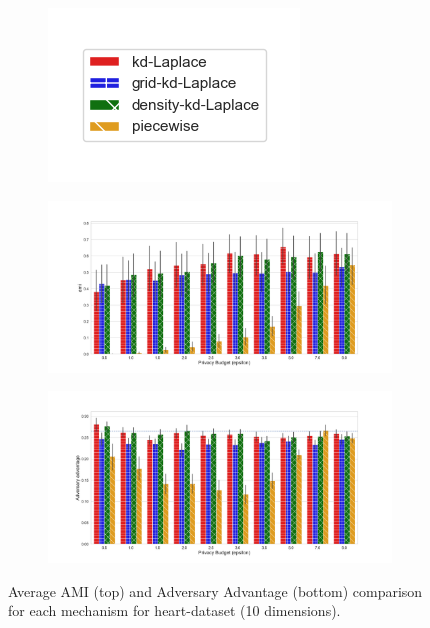 \begin{figure}[H]
  \centering
  \begin{subfigure}{0.30\textwidth}
    \includegraphics[width=\textwidth]{Results/kd-laplace/ami_bar_comparison_legend.png}
  \end{subfigure}
  \begin{subfigure}{1\textwidth}
    \includegraphics[width=1\textwidth]{Results/nd-laplace/ami_heart-dataset_comparison.png}
  \end{subfigure}
  \begin{subfigure}{1\textwidth}
    \includegraphics[width=1\textwidth]{Results/nd-laplace/attack_adv_heart-dataset_comparison.png}
  \end{subfigure}
  \caption{Average AMI (top) and Adversary Advantage (bottom) comparison for each mechanism for heart-dataset (10 dimensions).}
  \label{fig:utility_heart-dataset_comparison_nd_plot}
\end{figure}
\newpage

